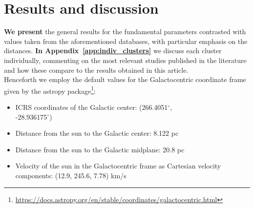 \documentclass[referee]{aa}
\begin{document}
\section{Results and discussion}
 \label{sec:results}

 \textbf{We present} the general results for the
 fundamental parameters contrasted with values taken from the
 aforementioned databases, with particular emphasis on the distances.
 \textbf{In Appendix~\ref{app:indiv_clusters}} we discuss each cluster
 individually, commenting on the most relevant studies published in the
 literature and how these compare to the results obtained in this article.\\

 Henceforth we employ the default values for the Galactocentric coordinate
 frame given by the astropy
 package\footnote{\url{https://docs.astropy.org/en/stable/coordinates/galactocentric.html}}:

 \begin{itemize}
  \item ICRS coordinates of the Galactic center: (266.4051$^{\circ}$,\\
  -28.936175$^{\circ}$)
  \item Distance from the sun to the Galactic center: 8.122 pc
  \item Distance from the sun to the Galactic midplane: 20.8 pc
  \item Velocity of the sun in the Galactocentric frame as Cartesian velocity
  components: (12.9, 245.6, 7.78) km/s
 \end{itemize}
\end{document}
